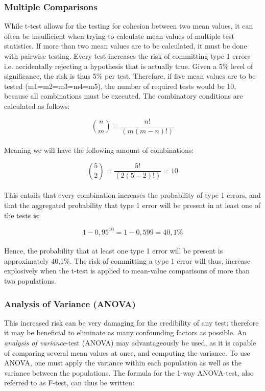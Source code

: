 \subsubsection{Multiple Comparisons}
While t-test allows for the testing for cohesion between two mean values, it can often be insufficient when trying to calculate mean values of multiple test statistics. If more than two mean values are to be calculated, it must be done with pairwise testing. Every test increases the risk of committing type 1 errors i.e. accidentally rejecting a hypothesis that is actually true. Given a 5\% level of significance, the risk is thus 5\% per test. Therefore, if five mean values are to be tested (m1=m2=m3=m4=m5), the number of required tests would be 10, because all combinations must be executed. The combinatory conditions are calculated as follows:

\begin{equation}
\binom{n}{m} = {\frac{n!}{(m(m-n)!)}} 
\end{equation}\\
Meaning we will have the following amount of combinations:

\begin{equation}
\binom{5}{2} = {\frac{5!}{(2(5-2)!)}} = 10 
\end{equation}\\
This entails that every combination increases the probability of type 1 errors, and that the aggregated probability that type 1 error will be present in at least one of the tests is:

\begin{equation}
1-0,95^{10}= 1-0,599 = 40,1\%
\end{equation}\\
Hence, the probability  that at least one type 1 error will be present is approximately 40,1\%. The risk of committing a type 1 error will thus, increase explosively when the t-test is applied to mean-value comparisons of more than two populations.
\\

\subsubsection{Analysis of Variance (ANOVA)}
This increased risk can be very damaging for the credibility of any test; therefore it may be beneficial to eliminate as many confounding factors as possible. An \textit{analysis of variance}-test (ANOVA) may advantageously be used, as it is capable of comparing several mean values at once, and computing the variance.  To use ANOVA, one must apply the variance within each population as well as the variance between the populations. The formula for the 1-way ANOVA-test, also referred to as F-test, can thus be written:\\

